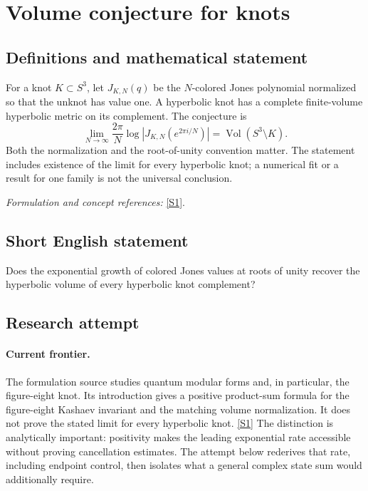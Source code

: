 \documentclass[11pt,a4paper]{article}
\newcommand{\sref}[2]{\hyperlink{source:#1:#2}{[S#2]}}
\newif\ifshowcatalogue
\newcommand{\cataloguescope}[1]{\ifshowcatalogue
 \paragraph{Exact scope in the supplied catalogue.}
 \begin{quote}\small #1\end{quote}\fi}
\numberwithin{equation}{section}
\begin{document}
\setcounter{section}{120}
\clearpage
\section{\texorpdfstring{Volume conjecture for knots}{Volume conjecture for knots}}\label{121}
\subsection{Definitions and mathematical statement}
For a knot $K\subset S^3$, let $J_{K,N}(q)$ be the $N$-colored Jones polynomial normalized so that the unknot has value one. A hyperbolic knot has a complete finite-volume hyperbolic metric on its complement. The conjecture is
\[
 \lim_{N\to\infty}\frac{2\pi}{N}\log\left|J_{K,N}(e^{2\pi i/N})\right|
 =\operatorname{Vol}(S^3\setminus K).
\]
Both the normalization and the root-of-unity convention matter. The statement includes existence of the limit for every hyperbolic knot; a numerical fit or a result for one family is not the universal conclusion.
\par\smallskip\textit{Formulation and concept references:} \sref{121}{1}.
\cataloguescope{Prove or disprove that for every hyperbolic knot K in S\textasciicircum{}3, the limit as N tends to infinity of (2*pi/N) log|J\_\{K,N\}(exp(2*pi*i/N))| equals the hyperbolic volume of S\textasciicircum{}3 minus K, using the standard normalized N-colored Jones polynomial.}
\subsection{Short English statement}
Does the exponential growth of colored Jones values at roots of unity recover the hyperbolic volume of every hyperbolic knot complement?
\subsection{Research attempt}

\paragraph{Current frontier.}
The formulation source studies quantum modular forms and, in particular,
the figure-eight knot.  Its introduction gives a positive product-sum
formula for the figure-eight Kashaev invariant and the matching volume
normalization.  It does not prove the stated limit for every hyperbolic
knot. \sref{121}{1}
The distinction is analytically important: positivity makes the leading
exponential rate accessible without proving cancellation estimates.
The attempt below rederives that rate, including endpoint control, then
isolates what a general complex state sum would additionally require.
\end{document}
